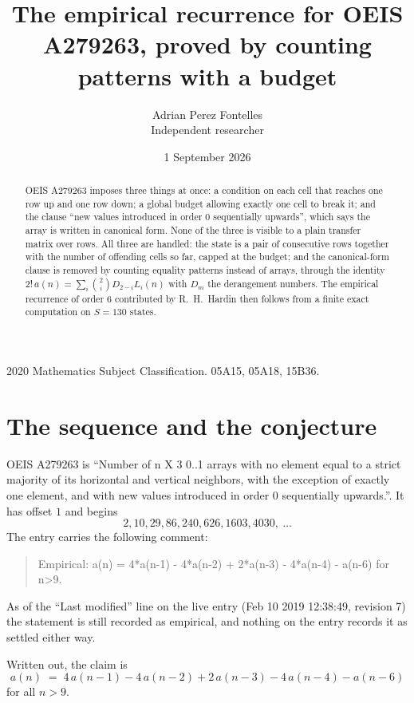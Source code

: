 \documentclass[11pt,a4paper]{article}
\title{The empirical recurrence for OEIS A279263, proved by counting patterns with a budget}
\author{Adrian Perez Fontelles\\ \small Independent researcher}
\date{1 September 2026}
\theoremstyle{plain}
\theoremstyle{definition}
\begin{document}
\maketitle

\begin{abstract}
OEIS A279263 imposes three things at once: a condition on each cell that reaches one row up and
one row down; a global budget allowing exactly one cell to
break it; and the clause ``new values introduced in order $0$ sequentially upwards'', which
says the array is written in canonical form. None of the three is visible to a plain transfer
matrix over rows. All three are handled: the state is a pair of consecutive rows
together with the number of offending cells so far, capped at the budget; and the
canonical-form clause is removed by counting equality patterns instead of arrays, through the
identity $2!\,a(n)=\sum_i\binom{2}{i}D_{2-i}L_i(n)$ with $D_m$ the derangement
numbers. The empirical recurrence of order $6$ contributed by R.~H.~Hardin then follows
from a finite exact computation on $S=130$ states.
\end{abstract}

\noindent\small 2020 Mathematics Subject Classification. 05A15, 05A18, 15B36.\normalsize

\section{The sequence and the conjecture}

OEIS A279263 is ``Number of n X 3 0..1 arrays with no element equal to a strict majority of its horizontal and vertical neighbors, with the exception of exactly one element, and with new values introduced in order 0 sequentially upwards.''. It has offset $1$ and begins
\[
2, 10, 29, 86, 240, 626, 1603, 4030,\ \dots
\]
The entry carries the following comment:
\begin{quote}\small
Empirical: a(n) = 4*a(n-1) - 4*a(n-2) + 2*a(n-3) - 4*a(n-4) - a(n-6) for n>9.
\end{quote}
As of the ``Last modified'' line on the live entry (Feb 10 2019 12:38:49, revision 7) the statement is
still recorded as empirical, and nothing on the entry records it as settled either way.

Written out, the claim is
\begin{equation}\label{eq:conj}
a(n)\;=\;4\,a(n-1) - 4\,a(n-2) + 2\,a(n-3) - 4\,a(n-4) - a(n-6)
\end{equation}
for all $n>9$.
\end{document}
